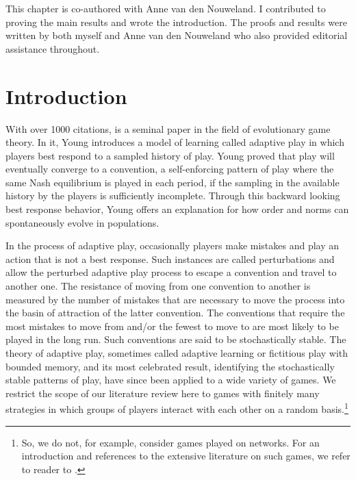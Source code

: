 This chapter is co-authored with Anne van den Nouweland. I contributed to proving the main results and wrote the introduction. The proofs and results were written by both myself and Anne van den Nouweland who also provided editorial assistance throughout.

\section{Introduction}
With over 1000 citations, \cite{young1993evolution} is a seminal paper in the field of evolutionary game theory. In it, Young introduces a model of learning called adaptive play in which players best respond to a sampled history of play. Young proved that play will eventually converge to a convention, a self-enforcing pattern of play where the same Nash equilibrium is played in each period, if the sampling in the available history by the players is sufficiently incomplete. Through this backward looking best response behavior, Young offers an explanation for how order and norms can spontaneously evolve in populations.

In the process of adaptive play, occasionally players make mistakes and play an action that is not a best response. Such instances are called perturbations and allow the perturbed adaptive play process to escape a convention and travel to another one. The resistance of moving from one convention to another is measured by the number of mistakes that are necessary to move the process into the basin of attraction of the latter convention. The conventions that require the most mistakes to move from and/or the fewest to move to are most likely to be played in the long run. Such conventions are said to be stochastically stable. The theory of adaptive play, sometimes called adaptive learning or fictitious play with bounded memory, and its most celebrated result, identifying the 
stochastically stable patterns of play, have since been applied to a wide variety of games. We restrict the scope of our literature review here to games with finitely many strategies 
in which groups of players interact with each other on a random basis.\footnote{So, we do not, for example, consider games played on networks. For an introduction and references to the extensive  literature on such games, we refer to reader to \cite{WALLACE2015327}.
}


